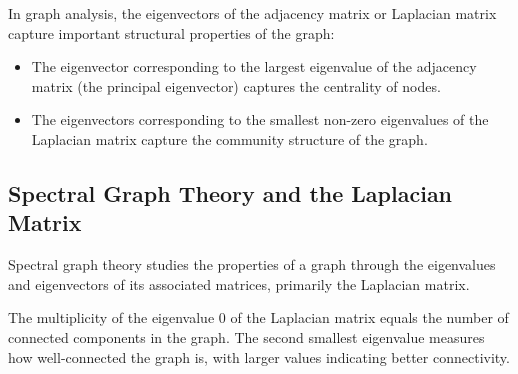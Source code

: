 In graph analysis, the eigenvectors of the adjacency matrix or Laplacian matrix capture important structural properties of the graph:

\begin{itemize}
    \item The eigenvector corresponding to the largest eigenvalue of the adjacency matrix (the principal eigenvector) captures the centrality of nodes.
    \item The eigenvectors corresponding to the smallest non-zero eigenvalues of the Laplacian matrix capture the community structure of the graph.
\end{itemize}

\subsection{Spectral Graph Theory and the Laplacian Matrix}
\label{subsec:SpectralGraphTheory}

Spectral graph theory studies the properties of a graph through the eigenvalues and eigenvectors of its associated matrices, primarily the Laplacian matrix.

The multiplicity of the eigenvalue 0 of the Laplacian matrix equals the number of connected components in the graph. The second smallest eigenvalue measures how well-connected the graph is, with larger values indicating better connectivity.

